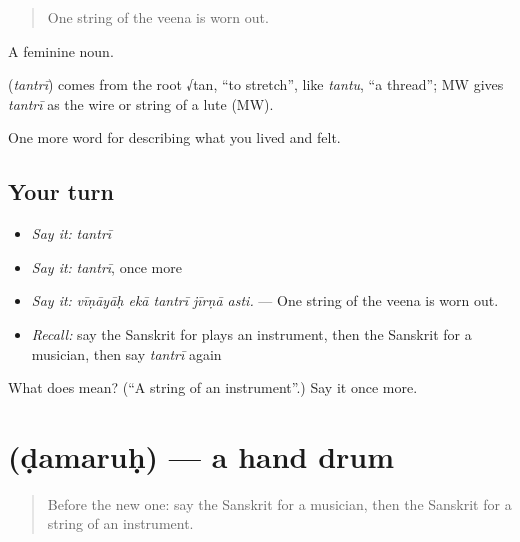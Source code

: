 \begin{quote}
One string of the veena is worn out.
\end{quote}

A feminine noun.

\begin{cousinweb}
\textbf{} (\emph{tantrī}) comes from the root √tan, \textquotedblleft{}to stretch\textquotedblright{}, like \emph{tantu}, \textquotedblleft{}a thread\textquotedblright{}; MW gives \emph{tantrī} as the wire or string of a lute (MW).
\end{cousinweb}

\begin{grammarlens}[title={What you've built}]
One more word for describing what you lived and felt.
\end{grammarlens}

\subsection*{Your turn}
\begin{itemize}
\raggedright
  \item \emph{Say it:} \emph{tantrī}
  \item \emph{Say it:} \emph{tantrī}, once more
  \item \emph{Say it:} \emph{vīṇāyāḥ ekā tantrī jīrṇā asti.} — One string of the veena is worn out.
  \item \emph{Recall:} say the Sanskrit for plays an instrument, then the Sanskrit for a musician, then say \emph{tantrī} again
\end{itemize}

\begin{tcolorbox}[breakable,colback=teal!4,colframe=teal!35!black,title={Before you move on}]
What does  mean? (\textquotedblleft{}A string of an instrument\textquotedblright{}.) Say it once more.
\end{tcolorbox}
\section[\texorpdfstring{\sk{डमरुः} (ḍamaruḥ)}{डमरुः (ḍamaruḥ)}]{ (ḍamaruḥ) — a hand drum}

\label{lesson:SA-C521-damaruh}



\begin{quote}
Before the new one: say the Sanskrit for a musician, then the Sanskrit for a string of an instrument.
\end{quote}

